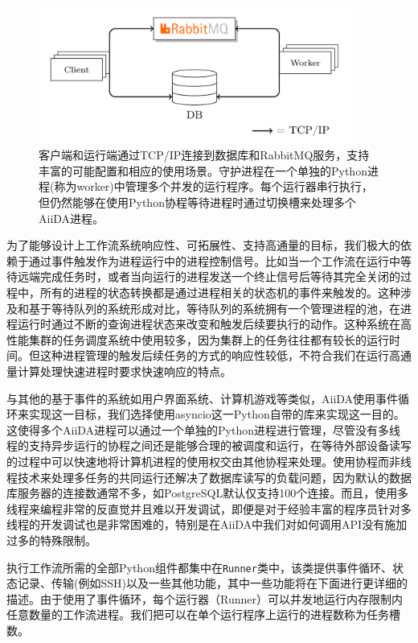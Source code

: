 \begin{figure}
  \includegraphics[width=0.92\textwidth]{figs/db-rmq.png}
  \caption{客户端和运行端通过TCP/IP连接到数据库和RabbitMQ服务，支持丰富的可能配置和相应的使用场景。守护进程在一个单独的Python进程(称为worker)中管理多个并发的运行程序。每个运行器串行执行，但仍然能够在使用Python协程等待进程时通过切换槽来处理多个AiiDA进程。}
  \label{fig:client-worker}
\end{figure}

为了能够设计上工作流系统响应性、可拓展性、支持高通量的目标，我们极大的依赖于通过事件触发作为进程运行中的进程控制信号。比如当一个工作流在运行中等待远端完成任务时，或者当向运行的进程发送一个终止信号后等待其完全关闭的过程中，所有的进程的状态转换都是通过进程相关的状态机的事件来触发的。这种涉及和基于等待队列的系统形成对比，等待队列的系统拥有一个管理进程的池，在进程运行时通过不断的查询进程状态来改变和触发后续要执行的动作。这种系统在高性能集群的任务调度系统中使用较多，因为集群上的任务往往都有较长的运行时间。但这种进程管理的触发后续任务的方式的响应性较低，不符合我们在运行高通量计算处理快速进程时要求快速响应的特点。

与其他的基于事件的系统如用户界面系统、计算机游戏等类似，AiiDA使用事件循环来实现这一目标，我们选择使用asyncio这一Python自带的库来实现这一目的。这使得多个AiiDA进程可以通过一个单独的Python进程进行管理，尽管没有多线程的支持异步运行的协程之间还是能够合理的被调度和运行，在等待外部设备读写的过程中可以快速地将计算机进程的使用权交由其他协程来处理。使用协程而非线程技术来处理多任务的共同运行还解决了数据库读写的负载问题，因为默认的数据库服务器的连接数通常不多，如PostgreSQL默认仅支持100个连接。而且，使用多线程来编程非常的反直觉并且难以开发调试，即便是对于经验丰富的程序员针对多线程的开发调试也是非常困难的，特别是在AiiDA中我们对如何调用API没有施加过多的特殊限制。

执行工作流所需的全部Python组件都集中在\texttt{Runner}类中，该类提供事件循环、状态记录、传输(例如SSH)以及一些其他功能，其中一些功能将在下面进行更详细的描述。由于使用了事件循环，每个运行器（Runner）可以并发地运行内存限制内任意数量的工作流进程。我们把可以在单个运行程序上运行的进程数称为任务槽数。

